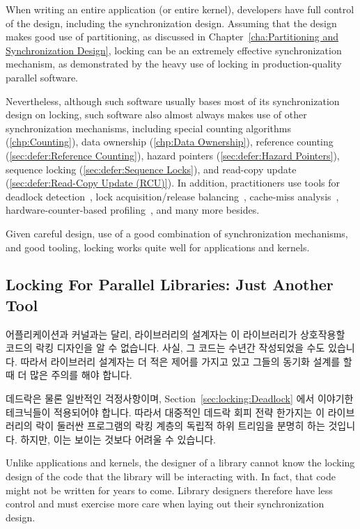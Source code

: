 When writing an entire application (or entire kernel), developers have
full control of the design, including the synchronization design.
Assuming that the design makes good use of partitioning, as discussed in
Chapter~\ref{cha:Partitioning and Synchronization Design}, locking
can be an extremely effective synchronization mechanism, as demonstrated
by the heavy use of locking in production-quality parallel software.

Nevertheless, although such software usually bases most of its
synchronization design on locking, such software also almost always
makes use of other synchronization mechanisms, including
special counting algorithms (\cref{chp:Counting}),
data ownership (\cref{chp:Data Ownership}),
reference counting (\cref{sec:defer:Reference Counting}),
hazard pointers (\cref{sec:defer:Hazard Pointers}),
sequence locking (\cref{sec:defer:Sequence Locks}), and
read-copy update (\cref{sec:defer:Read-Copy Update (RCU)}).
In addition, practitioners use tools for deadlock
detection~\cite{JonathanCorbet2006lockdep},
lock acquisition/release balancing~\cite{JonathanCorbet2004sparse},
cache-miss analysis~\cite{ValgrindHomePage},
hardware-counter-based profiling~\cite{LinuxKernelPerfWiki,OProfileHomePage},
and many more besides.

Given careful design, use of a good combination of synchronization
mechanisms, and good tooling, locking works quite well for applications
and kernels.

\fi

\subsection{Locking For Parallel Libraries: Just Another Tool}
\label{sec:locking:Locking For Parallel Libraries: Just Another Tool}

어플리케이션과 커널과는 달리, 라이브러리의 설계자는 이 라이브러리가 상호작용할
코드의 락킹 디자인을 알 수 없습니다.
사실, 그 코드는 수년간 작성되었을 수도 있습니다.
따라서 라이브러리 설계자는 더 적은 제어를 가지고 있고 그들의 동기화 설계를 할
때 더 많은 주의를 해야 합니다.

데드락은 물론 일반적인 걱정사항이며, Section~\ref{sec:locking:Deadlock} 에서
이야기한 테크닉들이 적용되어야 합니다.
따라서 대중적인 데드락 회피 전략 한가지는 이 라이브러리의 락이 둘러싼
프로그램의 락킹 계층의 독립적 하위 트리임을 분명히 하는 것입니다.
하지만, 이는 보이는 것보다 어려울 수 있습니다.

\iffalse

Unlike applications and kernels, the designer of a library cannot
know the locking design of the code that the library will be interacting
with.
In fact, that code might not be written for years to come.
Library designers therefore have less control and must exercise more
care when laying out their synchronization design.

